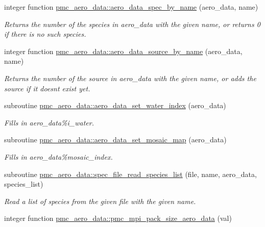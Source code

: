 \begin{DoxyCompactItemize}
integer function \mbox{\hyperlink{namespacepmc__aero__data_a80791fa1af8de683ac3d724d0b9291d1}{pmc\+\_\+aero\+\_\+data\+::aero\+\_\+data\+\_\+spec\+\_\+by\+\_\+name}} (aero\+\_\+data, name)
\begin{DoxyCompactList}\small\item\em Returns the number of the species in aero\+\_\+data with the given name, or returns 0 if there is no such species. \end{DoxyCompactList}\item 
integer function \mbox{\hyperlink{namespacepmc__aero__data_a4c9973271c8247581ab4e34fa0c6f0f6}{pmc\+\_\+aero\+\_\+data\+::aero\+\_\+data\+\_\+source\+\_\+by\+\_\+name}} (aero\+\_\+data, name)
\begin{DoxyCompactList}\small\item\em Returns the number of the source in aero\+\_\+data with the given name, or adds the source if it doesn\textquotesingle{}t exist yet. \end{DoxyCompactList}\item 
subroutine \mbox{\hyperlink{namespacepmc__aero__data_afac9815605157d507b8e708731c973c4}{pmc\+\_\+aero\+\_\+data\+::aero\+\_\+data\+\_\+set\+\_\+water\+\_\+index}} (aero\+\_\+data)
\begin{DoxyCompactList}\small\item\em Fills in aero\+\_\+data\%i\+\_\+water. \end{DoxyCompactList}\item 
subroutine \mbox{\hyperlink{namespacepmc__aero__data_a3913fb7b68923205dca2ec44b997505a}{pmc\+\_\+aero\+\_\+data\+::aero\+\_\+data\+\_\+set\+\_\+mosaic\+\_\+map}} (aero\+\_\+data)
\begin{DoxyCompactList}\small\item\em Fills in aero\+\_\+data\%mosaic\+\_\+index. \end{DoxyCompactList}\item 
subroutine \mbox{\hyperlink{namespacepmc__aero__data_a106682c46afe4a0f960a9535250b58cc}{pmc\+\_\+aero\+\_\+data\+::spec\+\_\+file\+\_\+read\+\_\+species\+\_\+list}} (file, name, aero\+\_\+data, species\+\_\+list)
\begin{DoxyCompactList}\small\item\em Read a list of species from the given file with the given name. \end{DoxyCompactList}\item 
integer function \mbox{\hyperlink{namespacepmc__aero__data_a0183904fc27e055d97fad1537c371c5d}{pmc\+\_\+aero\+\_\+data\+::pmc\+\_\+mpi\+\_\+pack\+\_\+size\+\_\+aero\+\_\+data}} (val)

\end{DoxyCompactItemize}
